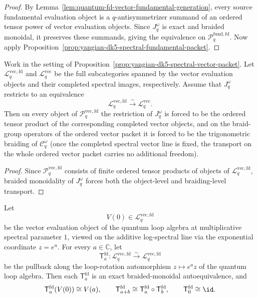 \begin{proof}
By Lemma~\ref{lem:quantum-fd-vector-fundamental-generation}, every
source fundamental evaluation object is a $q$-antisymmetrizer summand
of an ordered tensor power of vector evaluation objects.  Since
\(J_q^\omega\) is exact and braided monoidal, it preserves these
summands, giving the equivalence on
\(\mathcal{P}^{\mathrm{fund,fd}}_{q}\).  Now apply
Proposition~\ref{prop:yangian-dk5-spectral-fundamental-packet}.
\end{proof}

\begin{proposition}
\label{prop:yangian-dk5-spectral-vector-line}
Work in the setting of
Proposition~\ref{prop:yangian-dk5-spectral-vector-packet}.  Let
\(\mathcal{L}^{\mathrm{vec,fd}}_{q}\) and
\(\mathcal{L}^{\mathrm{vec}}_{q}\) be the full subcategories
spanned by the vector evaluation objects and their completed spectral
images, respectively.
Assume that \(J_q^\omega\)
restricts to an equivalence
\[
\mathcal{L}^{\mathrm{vec,fd}}_{q}
\xrightarrow{\sim}
\mathcal{L}^{\mathrm{vec}}_{q}.
\]
Then on every object of \(\mathcal{P}^{\mathrm{vec,fd}}_{q}\) the
restriction of \(J_q^\omega\) is forced to be the ordered tensor
product of the corresponding completed vector objects, and on the
braid-group operators of the ordered vector packet it is forced to be
the trigonometric braiding of \(\mathcal{C}_q^\omega\)
(once the completed spectral vector line is fixed,
the transport on the whole ordered vector packet carries no additional freedom).
\end{proposition}

\begin{proof}
Since \(\mathcal{P}^{\mathrm{vec,fd}}_{q}\) consists of finite ordered
tensor products of objects of \(\mathcal{L}^{\mathrm{vec,fd}}_{q}\),
braided monoidality of \(J_q^\omega\) forces both the object-level and
braiding-level transport.
\end{proof}

\begin{proposition}
\label{prop:quantum-fd-vector-seed-shifts}
Let
\[
V(0)\in \mathcal{L}^{\mathrm{vec,fd}}_{q}
\]
be the vector evaluation object of the quantum loop algebra at
multiplicative spectral parameter \(1\), viewed on the additive
log-spectral line via the exponential coordinate \(z=e^u\).  For every
\(a\in \mathbb{C}\), let
\[
\mathsf{T}^{\mathrm{fd}}_a\colon
\mathcal{L}^{\mathrm{vec,fd}}_{q}\xrightarrow{\sim}
\mathcal{L}^{\mathrm{vec,fd}}_{q}
\]
be the pullback along the loop-rotation automorphism \(z\mapsto e^a z\)
of the quantum loop algebra.  Then each
\(\mathsf{T}^{\mathrm{fd}}_a\) is an exact braided-monoidal
autoequivalence, and
\[
\mathsf{T}^{\mathrm{fd}}_a(V(0))\cong V(a),
\qquad
\mathsf{T}^{\mathrm{fd}}_{a+b}\cong
\mathsf{T}^{\mathrm{fd}}_a\circ \mathsf{T}^{\mathrm{fd}}_b,
\qquad
\mathsf{T}^{\mathrm{fd}}_0\cong \id .
\]

\end{proposition}

